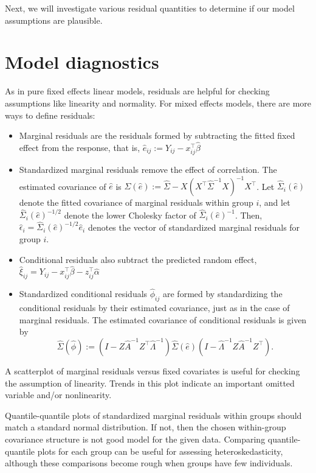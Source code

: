 \documentclass[
]{book}
\begin{document}
Next, we will investigate various residual quantities to determine if our model assumptions are plausible.

\hypertarget{model-diagnostics}{%
\section{Model diagnostics}\label{model-diagnostics}}

As in pure fixed effects linear models, residuals are helpful for checking assumptions like linearity and normality. For mixed effects models, there are more ways to define residuals:

\begin{itemize}
\item
  Marginal residuals are the residuals formed by subtracting the fitted fixed effect from the response, that is, \(\hat e_{ij} := Y_{ij} - x_{ij}^\top \hat\beta\)
\item
  Standardized marginal residuals remove the effect of correlation. The estimated covariance of \(\hat e\) is \(\hat\Sigma(\hat e) := \hat\Sigma - X(X^\top \hat\Sigma^{-1} X)^{-1}X^\top\). Let \(\hat\Sigma_i(\hat e)\) denote the fitted covariance of marginal residuals within group \(i\), and let \(\hat\Sigma_i(\hat e)^{-1/2}\) denote the lower Cholesky factor of \(\hat\Sigma_i(\hat e)^{-1}\). Then, \(\hat \epsilon_{i} = \hat\Sigma_i(\hat e)^{-1/2}\hat e_i\) denotes the vector of standardized marginal residuals for group \(i\).
\item
  Conditional residuals also subtract the predicted random effect, \(\hat \xi_{ij} = Y_{ij} - x_{ij}^\top \hat\beta - z_{ij}^\top \hat \alpha\)
\item
  Standardized conditional residuals \(\hat\phi_{ij}\) are formed by standardizing the conditional residuals by their estimated covariance, just as in the case of marginal residuals. The estimated covariance of conditional residuals is given by
  \[\hat\Sigma(\hat \phi) := (I-Z\hat A^{-1}Z^\top \hat\Lambda^{-1})\hat\Sigma(\hat e)(I-\hat\Lambda^{-1}Z\hat A^{-1}Z^\top).\]
\end{itemize}

A scatterplot of marginal residuals versus fixed covariates is useful for checking the assumption of linearity. Trends in this plot indicate an important omitted variable and/or nonlinearity.

Quantile-quantile plots of standardized marginal residuals within groups should match a standard normal distribution. If not, then the chosen within-group covariance structure is not good model for the given data. Comparing quantile-quantile plots for each group can be useful for assessing heteroskedasticity, although these comparisons become rough when groups have few individuals.
\end{document}
